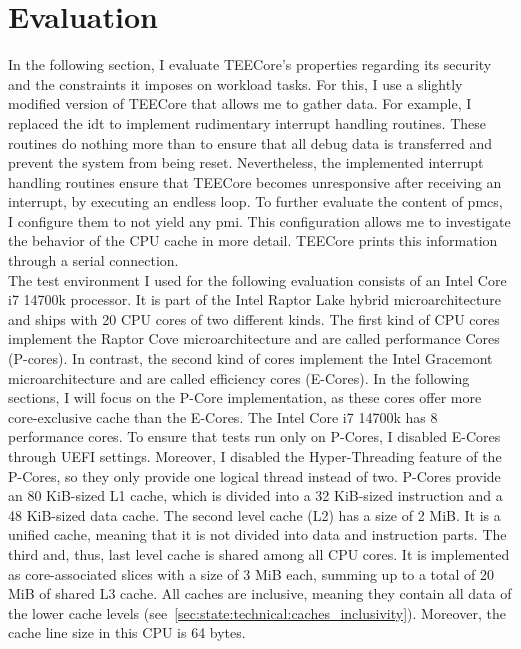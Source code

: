 \chapter{Evaluation}
\label{sec:evaluation}


In the following section, I evaluate TEECore's properties regarding its security
and the constraints it imposes on workload tasks. For this, I use a slightly
modified version of TEECore that allows me to gather data. For example, I
replaced the \gls{idt} to implement rudimentary interrupt handling routines.
These routines do nothing more than to ensure that all debug data is transferred
and prevent the system from being reset. Nevertheless, the implemented interrupt
handling routines ensure that TEECore becomes unresponsive after receiving an
interrupt, by executing an endless loop. To further evaluate the content of
\glspl{pmc}, I configure them to not yield any \gls{pmi}. This configuration
allows me to investigate the behavior of the CPU cache in more detail. TEECore
prints this information through a serial connection.\\

The test environment I used for the following evaluation consists of an Intel
Core i7 14700k processor. It is part of the Intel Raptor Lake hybrid
microarchitecture and ships with 20 CPU cores of two different kinds. The first
kind of CPU cores implement the Raptor Cove microarchitecture and are called
performance Cores (P-cores). In contrast, the second kind of cores implement the
Intel Gracemont microarchitecture and are called efficiency cores (E-Cores). In
the following sections, I will focus on the P-Core implementation, as these
cores offer more core-exclusive cache than the E-Cores. The Intel Core i7 14700k
has 8 performance cores. To ensure that tests run only on P-Cores, I disabled
E-Cores through UEFI settings. Moreover, I disabled the Hyper-Threading feature
of the P-Cores, so they only provide one logical thread instead of two. P-Cores
provide an 80 KiB-sized L1 cache, which is divided into a 32 KiB-sized
instruction and a 48 KiB-sized data cache. The second level cache (L2) has a
size of 2 MiB. It is a unified cache, meaning that it is not divided into data
and instruction parts. The third and, thus, last level cache is shared among all
CPU cores. It is implemented as core-associated slices with a size of 3 MiB
each, summing up to a total of 20 MiB of shared L3 cache. All caches are
inclusive, meaning they contain all data of the lower cache levels
(see~\ref{sec:state:technical:caches_inclusivity}). Moreover, the cache line
size in this CPU is 64 bytes.

